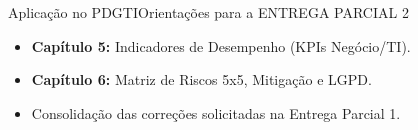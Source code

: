 \begin{senaiframe}{Aplicação no PDGTI}{Orientações para a ENTREGA PARCIAL 2}
  \vspace{0.5cm}
  \begin{tcolorbox}[senaigreencard, title={Entrega Parcial 2 (Capítulos 5 e 6) – Data: 09/Out}]
    \begin{itemize}
      \item \textbf{Capítulo 5:} Indicadores de Desempenho (KPIs Negócio/TI).
      \item \textbf{Capítulo 6:} Matriz de Riscos 5x5, Mitigação e LGPD.
      \item Consolidação das correções solicitadas na Entrega Parcial 1.
    \end{itemize}
  \end{tcolorbox}
\end{senaiframe}

